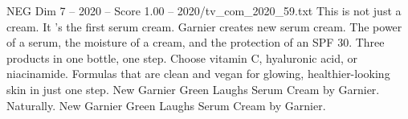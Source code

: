 \begin{textsample}{NEG Dim 7 – 2020 – Score 1.00 – 2020/tv\_com\_2020\_59.txt}  \label{ex:f7_neg_008}
This is not just a cream.
It 's the first serum cream.
Garnier creates new serum cream.
The power of a serum, the moisture of a cream, and the protection of an SPF 30.
Three products in one bottle, one step.
Choose vitamin C, hyaluronic acid, or niacinamide.
Formulas that are clean and vegan for glowing, healthier-looking skin in just one step.
New Garnier Green Laughs Serum Cream by Garnier.
Naturally.
New Garnier Green Laughs Serum Cream by Garnier.

\end{textsample}
